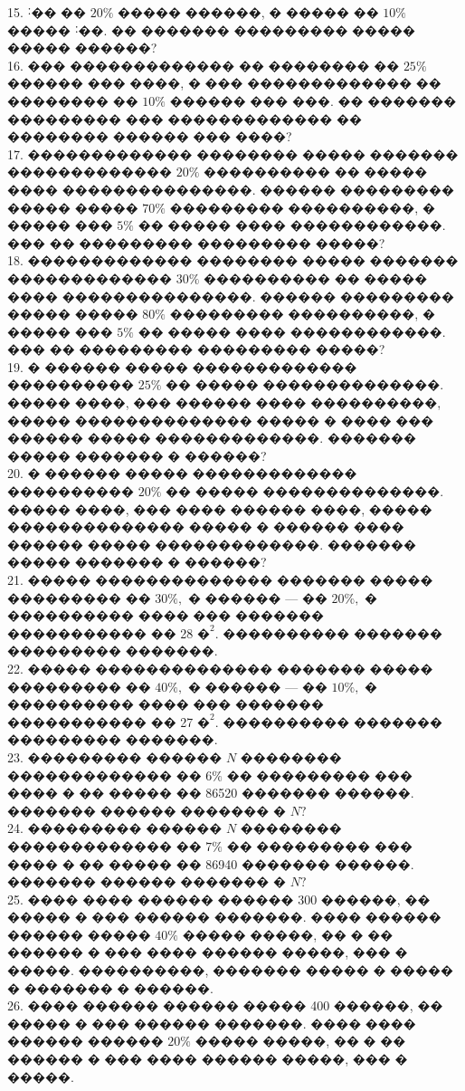 \documentclass[12pt]{article}
\begin{document}
15. ˸�� �� $20\%$ ����� ������, � ����� �� $10\%$ ����� ˸��. �� ������� ��������� ����� ����� ������?\\
16. ��� ������������� �� �������� �� $25\%$ ������ ��� ����, � ��� ������������� �� �������� �� $10\%$ ������ ��� ���. �� ������� ��������� ��� ������������� �� �������� ������ ��� ����?\\
17. ������������� �������� ����� ������� ������������� $20\%$ ���������� �� ����� ����
���������������. ������ ��������� ����� ����� $70\%$ ��������� ����������, � �����
��� $5\%$ �� ����� ���� ������������. ��� �� ��������� ��������� �����?\\
18. ������������� �������� ����� ������� ������������� $30\%$ ���������� �� ����� ����
���������������. ������ ��������� ����� ����� $80\%$ ��������� ����������, � �����
��� $5\%$ �� ����� ���� ������������. ��� �� ��������� ��������� �����? \\
19. � ������ ����� ������������� ���������� $25\%$ �� ����� ��������������. ����� ����, ��� ������ ���� ����������, ����� �������������� ����� � ���� ��� ������ ����� �������������. ������� ����� ������� � ������?\\
20. � ������ ����� ������������� ���������� $20\%$ �� ����� ��������������. ����� ����, ��� ���� ������ ����, ����� �������������� ����� � ������ ���� ������ ����� �������������. ������� ����� ������� � ������?\\
21. ����� �������������� ������� ����� ��������� �� $30\%,$ � ������ --- �� $20\%,$ � ���������� ���� ��� ������� ����������� �� 28 $\text{�}^2.$ ���������� ������� ��������� �������.\\
22. ����� �������������� ������� ����� ��������� �� $40\%,$ � ������ --- �� $10\%,$ � ���������� ���� ��� ������� ����������� �� 27 $\text{�}^2.$ ���������� ������� ��������� �������.\\
23. ��������� ������ $N$ �������� ������������� �� $6\%$ �� ��������� ��� ���� � �� ����� �� 86520 ������� ������. ������� ������ ������� � $N?$\\
24. ��������� ������ $N$ �������� ������������� �� $7\%$ �� ��������� ��� ���� � �� ����� �� 86940 ������� ������. ������� ������ ������� � $N?$\\
25. ���� ���� ������ ������ 300 ������, �� ����� � ��� ������ �������. ���� ������ ������ ����� $40\%$ ����� �����, �� � �� ������ � ��� ���� ������ �����, ��� � �����.
����������, ������� ����� � ����� � ������� � ������.\\
26. ���� ������ ������ ����� 400 ������, �� ����� � ��� ������ �������. ���� ���� ������ ������ $20\%$ ����� �����, �� � �� ������ � ��� ���� ������ �����, ��� � �����.
\end{document}
